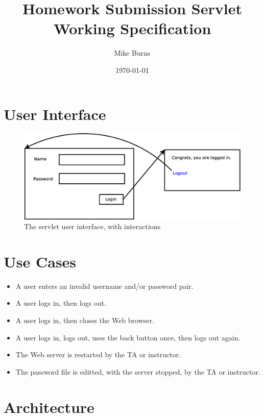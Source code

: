 \documentclass{article}
\begin{document}
\title{Homework Submission Servlet Working Specification}
\author{Mike Burns}
\date{\today}

\maketitle

\section{User Interface}\label{sec:ui}

\begin{figure}[h]
\centering
\includegraphics[scale=.35]{servlet.eps}
\caption{The servlet user interface, with interactions}
\label{fig:ui}
\end{figure}

\section{Use Cases}\label{sec:usecases}

\begin{itemize}
\item{A user enters an invalid username and/or password pair.}
\item{A user logs in, then logs out.}
\item{A user logs in, then closes the Web browser.}
\item{A user logs in, logs out, uses the back button once, then logs out again.}
\item{The Web server is restarted by the TA or instructor.}
\item{The password file is editted, with the server stopped, by the TA or
instructor.}
\end{itemize}

\pagebreak

\section{Architecture}\label{sec:arch}
\end{document}
